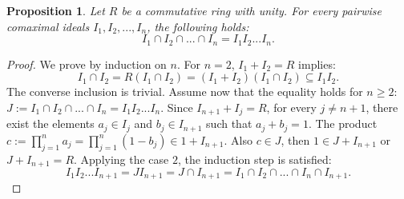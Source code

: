 \documentclass[12pt]{article}
\newtheorem{prop}{Proposition}
\begin{document}
\begin{prop} Let $R$ be a commutative ring with unity. For every pairwise comaximal ideals $I_1, I_2, ... , I_n$, the following holds:\begin{equation}
I_1 \cap I_2 \cap ... \cap I_n = I_1I_2 ... I_n.\end{equation}\end{prop}\begin{proof} We prove by induction on $n$. For $n=2$, $I_1+I_2 = R$ implies:\begin{equation}
I_1\cap I_2 = R(I_1\cap I_2) = (I_1 + I_2)(I_1 \cap I_2) \subseteq I_1I_2. \end{equation}
 The converse inclusion is trivial. Assume now that the equality holds for $n \ge 2$: $J:= I_1 \cap I_2 \cap ... \cap I_n = I_1I_2 ... I_n$. Since $ I_{n+1}+I_j = R$, for every $j \neq {n+1}$, there exist the elements $a_j\in I_j$ and $b_j\in I_{n+1}$ such that $a_j + b_j =1$. The product $c:= \prod_{j=1}^n a_j = \prod_{j=1}^n(1-b_j)\in 1 + I_{n+1}$. Also $c\in J$, then $1\in J+I_{n+1}$ or $J+I_{n+1} =R$.\newline
 Applying the case $2$, the induction step is satisfied:\begin{equation} I_1I_2 ... I_{n+1} = J I_{n+1} = J\cap I_{n+1} = I_1\cap I_2 \cap ... \cap I_n \cap I_{n+1}. \end{equation} \end{proof}
\end{document}
